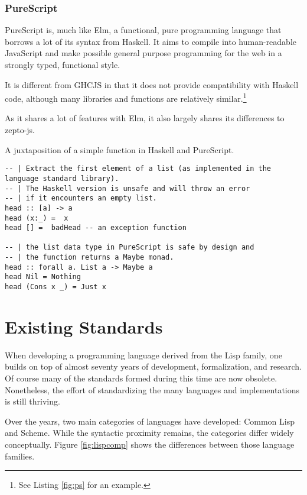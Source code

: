 \documentclass[oneside,11pt,xetex]{scrbook}
\begin{document}
\subsubsection{PureScript}

PureScript is, much like Elm, a functional, pure programming language
that borrows a lot of its syntax from Haskell. It aims to compile into
human-readable JavaScript and make possible general purpose programming
for the web in a strongly typed, functional style.

It is different from GHCJS in that it does not provide compatibility
with Haskell code, although many libraries and functions are relatively
similar.\footnote{See Listing \ref{fig:ps} for an example.}

As it shares a lot of features with Elm, it also largely shares its
differences to zepto-js.

\begin{listing}[H]
\caption{A juxtaposition of a simple function in Haskell and PureScript.}
\begin{verbatim}
-- | Extract the first element of a list (as implemented in the language standard library).
-- | The Haskell version is unsafe and will throw an error
-- | if it encounters an empty list.
head :: [a] -> a
head (x:_) =  x
head [] =  badHead -- an exception function

-- | the list data type in PureScript is safe by design and
-- | the function returns a Maybe monad.
head :: forall a. List a -> Maybe a
head Nil = Nothing
head (Cons x _) = Just x
\end{verbatim}
\label{fig:ps}
\end{listing}

\section{Existing Standards}
\label{sec:ExistingStandards}

When developing a programming language derived from the Lisp family, one builds on
top of almost seventy years of development, formalization, and research. Of course
many of the standards formed during this time are now obsolete.
Nonetheless, the effort of standardizing the many languages and implementations
is still thriving.

Over the years, two main categories of languages have developed: Common Lisp
and Scheme. While the syntactic proximity remains, the categories differ
widely conceptually. Figure \ref{fig:lispcomp} shows the differences between
those language families.
\end{document}
